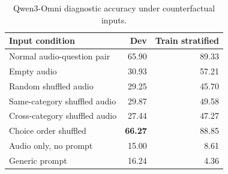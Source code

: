 \begin{table}[t]
\centering
\small
\caption{Qwen3-Omni diagnostic accuracy under counterfactual inputs.}
\label{tab:diagnostic_scores}
\begin{tabular}{l|rr}
\toprule
Input condition & Dev & Train stratified \\
\midrule
Normal audio-question pair & 65.90 & 89.33 \\
Empty audio & 30.93 & 57.21 \\
Random shuffled audio & 29.25 & 45.70 \\
Same-category shuffled audio & 29.87 & 49.58 \\
Cross-category shuffled audio & 27.44 & 47.27 \\
Choice order shuffled & \textbf{66.27} & 88.85 \\
Audio only, no prompt & 15.00 & 8.61 \\
Generic prompt & 16.24 & 4.36 \\
\bottomrule
\end{tabular}
\vspace{-15pt}
\end{table}